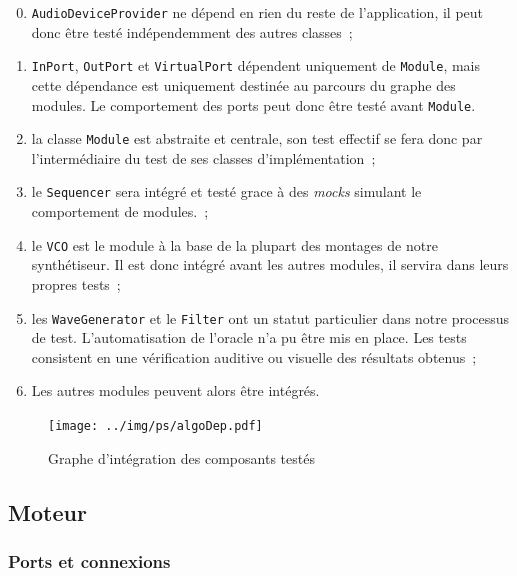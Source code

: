 \begin{enumerate}
    \setcounter{enumi}{-1}
    \item  \texttt{AudioDeviceProvider} ne dépend en rien du reste de l'application, il peut donc être testé indépendemment des autres classes~;
    \item \texttt{InPort}, \texttt{OutPort} et \texttt{VirtualPort} dépendent uniquement de \texttt{Module}, mais cette dépendance est uniquement destinée au parcours du graphe des modules. Le comportement des ports peut donc être testé avant \texttt{Module}.
    \item la classe \texttt{Module} est abstraite et centrale, son test effectif se fera donc par l'intermédiaire du test de ses classes d'implémentation~;
    \item le \texttt{Sequencer} sera intégré et testé grace à des \textit{mocks} simulant le comportement de modules.~;
    \item le \texttt{VCO} est le module à la base de la plupart des montages de notre synthétiseur. Il est donc intégré avant les autres modules, il servira dans leurs propres tests~;
    \item les \texttt{WaveGenerator} et le \texttt{Filter} ont un statut particulier dans notre processus de test. L'automatisation de l'oracle n'a pu être mis en place. Les tests consistent en une vérification auditive ou visuelle des résultats obtenus~;
    \item Les autres modules peuvent alors être intégrés.
\end{enumerate}

\begin{figure}[ht]
\centering
\texttt{[image: ../img/ps/algoDep.pdf]}
\caption{Graphe d’intégration des composants testés}
\label{integration}
\end{figure}


\subsection{Moteur}

\subsubsection{Ports et connexions}

